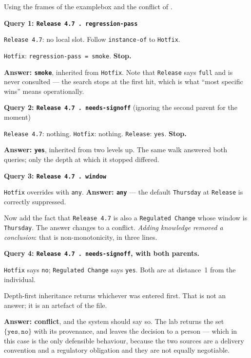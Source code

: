 \begin{worked}
Using the frames of the examplebox and the conflict of .

\smallskip
\textbf{Query 1: \texttt{Release 4.7 . regression-pass}}
\begin{tight}
  \item \texttt{Release 4.7}: no local slot. Follow \texttt{instance-of} to
        \texttt{Hotfix}.
  \item \texttt{Hotfix}: \texttt{regression-pass = smoke}. \textbf{Stop.}
\end{tight}
\textbf{Answer: \texttt{smoke}}, inherited from \texttt{Hotfix}. Note that
\texttt{Release} says \texttt{full} and is never consulted --- the search stops at
the first hit, which is what ``most specific wins'' means operationally.

\smallskip
\textbf{Query 2: \texttt{Release 4.7 . needs-signoff}} (ignoring the second parent
for the moment)
\begin{tight}
  \item \texttt{Release 4.7}: nothing. \texttt{Hotfix}: nothing.
        \texttt{Release}: \texttt{yes}. \textbf{Stop.}
\end{tight}
\textbf{Answer: \texttt{yes}}, inherited from two levels up. The same walk answered
both queries; only the depth at which it stopped differed.

\smallskip
\textbf{Query 3: \texttt{Release 4.7 . window}}
\begin{tight}
  \item \texttt{Hotfix} overrides with \texttt{any}. \textbf{Answer: \texttt{any}}
        --- the default \texttt{Thursday} at \texttt{Release} is correctly
        suppressed.
\end{tight}
Now add the fact that \texttt{Release 4.7} is also a \texttt{Regulated Change} whose
window is \texttt{Thursday}. The answer changes to a conflict. \emph{Adding
knowledge removed a conclusion}: that is non-monotonicity, in three lines.

\smallskip
\textbf{Query 4: \texttt{Release 4.7 . needs-signoff}, with both parents.}
\begin{tight}
  \item \texttt{Hotfix} says \texttt{no}; \texttt{Regulated Change} says
        \texttt{yes}. Both are at distance~1 from the individual.
  \item Depth-first inheritance returns whichever was entered first. That is not an
        answer; it is an artefact of the file.
\end{tight}
\textbf{Answer: conflict}, and the system should say so. The lab returns the set
$\{\texttt{yes}, \texttt{no}\}$ with its provenance, and leaves the decision to a
person --- which in this case is the only defensible behaviour, because the two
sources are a delivery convention and a regulatory obligation and they are not
equally negotiable.
\end{worked}

